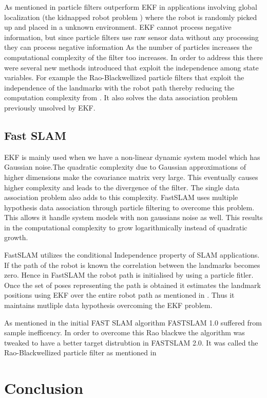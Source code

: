 \documentclass[conference]{IEEEtran}
\begin{document}
As mentioned in \cite{Thrun2002a} particle filters outperform EKF in applications involving global localization (the kidnapped robot problem ) where the robot is randomly picked up and placed in a unknown environment. 
EKF cannot process negative information, but since particle filters use raw sensor data without any processing they can process negative information\cite{Thrun2002a}
As the number of particles increases the computational complexity of the filter too increases. In order to address this there were several new methods introduced that  exploit the independence among state variables. For example the Rao-Blackwellized particle filters that exploit the independence of the landmarks with the robot path thereby reducing the computation complexity from \cite{Yuan2012}. It also solves the data association problem previously unsolved by EKF.
	

	
	\subsection{Fast SLAM}
	EKF is mainly used when we have a non-linear dynamic system model which has Gaussian noise.The quadratic complexity due to Gaussian approximations of higher dimensions make the covariance matrix very large. This eventually causes higher complexity and leads to the divergence of the filter. The single data association problem also adds to this complexity. FastSLAM uses multiple hypothesis data association through particle filtering to overcome this problem. This allows it handle system models with non gaussians noise as well. This results in the computational complexity to grow logarithmically instead of quadratic growth.
	
	FastSLAM utilizes the conditional Independence property of SLAM applications. If the path of the robot is known the correlation between the landmarks becomes zero. Hence in FastSLAM the robot path is initialised by using a particle fitler. Once the set of poses representing the path is obtained it estimates the landmark positions using EKF over the entire robot path as mentioned in \cite{Yuan2012}. Thus it maintains mutliple data hypothesis overcoming the EKF problem.
	
	As mentioned in \cite{Thrun2002a} the initial FAST SLAM algorithm  FASTSLAM 1.0  suffered from sample inefficency. In order to overcome this Rao blackwe the algorithm was tweaked to have a better target distrubtion in FASTSLAM 2.0. It was called the Rao-Blackwellized particle filter as mentioned in \cite{Montemerlo2003}

	
	
	
	
	
	
	
	
	
	
	
	
	
	
	
	
	\section{Conclusion}
	
	
	
	
	
	
	
	
	
	
	
\end{document}
